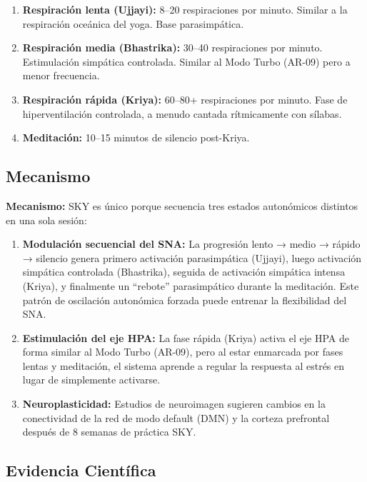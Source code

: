 \documentclass[12pt,a4paper]{article}
\newcommand{\mecanismo}[1]{\textbf{Mecanismo:} #1}
\begin{document}
\begin{enumerate}
    \item \textbf{Respiración lenta (Ujjayi):} 8--20 respiraciones por minuto.
          Similar a la respiración oceánica del yoga. Base parasimpática.
    \item \textbf{Respiración media (Bhastrika):} 30--40 respiraciones por
          minuto. Estimulación simpática controlada. Similar al Modo Turbo
          (AR-09) pero a menor frecuencia.
    \item \textbf{Respiración rápida (Kriya):} 60--80+ respiraciones por
          minuto. Fase de hiperventilación controlada, a menudo cantada
          rítmicamente con sílabas.
    \item \textbf{Meditación:} 10--15 minutos de silencio post-Kriya.
\end{enumerate}

\subsection{Mecanismo}

\mecanismo{SKY es único porque secuencia tres estados autonómicos distintos
en una sola sesión:}

\begin{enumerate}
    \item \textbf{Modulación secuencial del SNA:} La progresión lento →
          medio → rápido → silencio genera primero activación parasimpática
          (Ujjayi), luego activación simpática controlada (Bhastrika),
          seguida de activación simpática intensa (Kriya), y finalmente un
          ``rebote'' parasimpático durante la meditación. Este patrón de
          oscilación autonómica forzada puede entrenar la flexibilidad del
          SNA.
    \item \textbf{Estimulación del eje HPA:} La fase rápida (Kriya) activa
          el eje HPA de forma similar al Modo Turbo (AR-09), pero al estar
          enmarcada por fases lentas y meditación, el sistema aprende a
          regular la respuesta al estrés en lugar de simplemente activarse.
    \item \textbf{Neuroplasticidad:} Estudios de neuroimagen sugieren
          cambios en la conectividad de la red de modo default (DMN) y la
          corteza prefrontal después de 8 semanas de práctica SKY.
\end{enumerate}

\subsection{Evidencia Científica}
\end{document}
